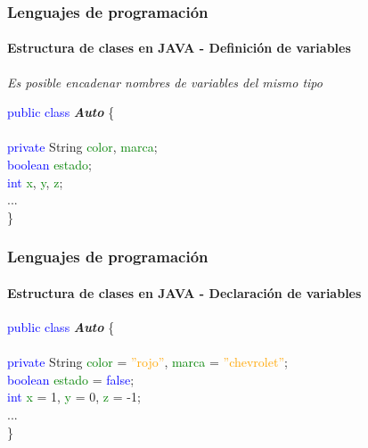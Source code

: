 \documentclass{beamer}
\begin{document}
		\begin{frame}
			\frametitle{Lenguajes de programaci\'on}
			\framesubtitle{Estructura de clases en JAVA - Definici\'on de variables}

			\begin{block}{}
			{\scriptsize
				\emph{Es posible encadenar nombres de variables del mismo tipo}
			}
			\end{block}

			\begin{block}{}
				\textcolor{blue}{public class} \textbf{\emph{Auto}} \{ \\
				\hspace{1cm} \\
				\hspace{1cm} \textcolor{blue}{private} String \textcolor{green}{color}, \textcolor{green}{marca}; \ \\
				\hspace{1cm} \textcolor{blue}{boolean} \textcolor{green}{estado}; \ \\
				\hspace{1cm} \textcolor{blue}{int} \textcolor{green}{x}, \textcolor{green}{y}, \textcolor{green}{z}; \ \\
				\hspace{1cm} ... \\
				\}
			\end{block}
			
		\end{frame}

		\begin{frame}
			\frametitle{Lenguajes de programaci\'on}
			\framesubtitle{Estructura de clases en JAVA - Declaraci\'on de variables}

			\begin{block}{}
				\textcolor{blue}{public class} \textbf{\emph{Auto}} \{ \\
				\hspace{1cm} \\
				\hspace{1cm} \textcolor{blue}{private} String \textcolor{green}{color} = \textcolor{orange}{''rojo''}, \textcolor{green}{marca} = \textcolor{orange}{''chevrolet''}; \ \\
				\hspace{1cm} \textcolor{blue}{boolean} \textcolor{green}{estado} = \textcolor{blue}{false}; \ \\
				\hspace{1cm} \textcolor{blue}{int} \textcolor{green}{x} = 1, \textcolor{green}{y} = 0, \textcolor{green}{z} = -1; \ \\
				\hspace{1cm} ... \\
				\}
			\end{block}
			
		\end{frame}
\end{document}
